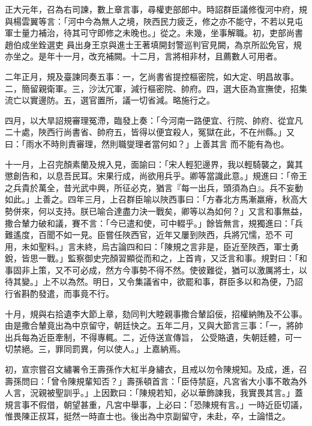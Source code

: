 \begin{pinyinscope}
 正大元年，召為右司諫，數上章言事，尋權吏部郎中。時詔群臣議修復河中府，規與楊雲翼等言：「河中今為無人之境，陜西民力疲乏，修之亦不能守，不若以見屯軍士量力補治，待其可守即修之未晚也。」從之。未幾，坐事解職。初，吏部尚書趙伯成坐銓選吏
 員出身王京與進士王著填開封警巡判官見闕，為京所訟免官，規亦坐之。是年十一月，改充補闕。十二月，言將相非材，且薦數人可用者。



 二年正月，規及臺諫同奏五事：一，乞尚書省提控樞密院，如大定、明昌故事。二，簡留親衛軍。三，沙汰冗軍，減行樞密院、帥府。四，選大臣為宣撫使，招集流亡以實邊防。五，選官置所，議一切省減。略施行之。



 四月，以大旱詔規審理冤滯，臨發上奏：「今河南一路便宜、行院、帥府、從宜凡二十處，陜西行尚書省、帥府五，皆得以便宜殺人，冤獄在此，不在州縣。」又曰：「雨水不時則責審理，然則職燮理者當何如？」上善其言
 而不能有為也。



 十一月，上召完顏素蘭及規入見，面諭曰：「宋人輕犯邊界，我以輕騎襲之，冀其懲創告和，以息吾民耳。宋果行成，尚欲用兵乎。卿等當識此意。」規進曰：「帝王之兵貴於萬全，昔光武中興，所征必克，猶言『每一出兵，頭須為白』。兵不妄動如此。」上善之。四年三月，上召群臣喻以陜西事曰：「方春北方馬漸羸瘠，秋高大勢併來，何以支持。朕已喻合達盡力決一戰矣，卿等以為如何？」又言和事無益，撒合輦力破和議，賽不言：「今已遣和使，可中輟乎。」餘皆無言，規獨進曰：「兵難遙度，百聞不如一見。臣嘗任陜西官，近年又屢到陜西，兵將冗懦，恐不
 可用，未如聖料。」言未終，烏古論四和曰：「陳規之言非是，臣近至陜西，軍士勇銳，皆思一戰。」監察御史完顏習顯從而和之，上首肯，又泛言和事。規對曰：「和事固非上策，又不可必成，然方今事勢不得不然。使彼難從，猶可以激厲將士，以待其變。」上不以為然。明日，又令集議省中，欲罷和事，群臣多以和為便，乃詔行省斟酌發遣，而事竟不行。



 十月，規與右拾遺李大節上章，劾同判大睦親事撒合輦諂佞，招權納賄及不公事。由是撒合輦竟出為中京留守，朝廷快之。五年二月，又與大節言三事：「一，將帥出兵每為近臣牽制，不得專輒。二，近侍送宣傳旨，
 公受賂遺，失朝廷體，可一切禁絕。三，罪同罰異，何以使人。」上嘉納焉。



 初，宣宗嘗召文繡署令王壽孫作大紅半身繡衣，且戒以勿令陳規知。及成，進，召壽孫問曰：「曾令陳規輩知否？」壽孫頓首言：「臣侍禁庭，凡宮省大小事不敢為外人言，況親被聖訓乎。」上因歎曰：「陳規若知，必以華飾諫我，我實畏其言。」蓋規言事不假借，朝望甚重，凡宮中舉事，上必曰：「恐陳規有言。」一時近臣切議，惟畏陳正叔耳，挺然一時直士也。後出為中京副留守，未赴，卒，士論惜之。




\end{pinyinscope}
